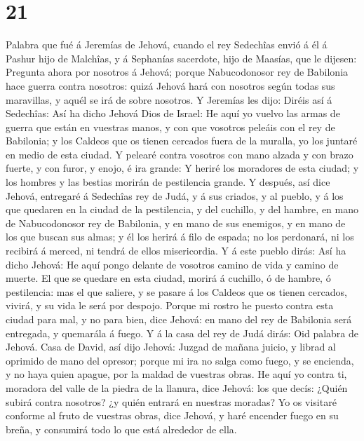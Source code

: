 \hypertarget{section-20}{%
\section{21}\label{section-20}}

 Palabra que fué á Jeremías de Jehová, cuando el rey
Sedechîas envió á él á Pashur hijo de Malchîas, y á Sephanías sacerdote,
hijo de Maasías, que le dijesen:  Pregunta ahora por
nosotros á Jehová; porque Nabucodonosor rey de Babilonia hace guerra
contra nosotros: quizá Jehová hará con nosotros según todas sus
maravillas, y aquél se irá de sobre nosotros.  Y Jeremías
les dijo: Diréis así á Sedechîas:  Así ha dicho Jehová Dios
de Israel: He aquí yo vuelvo las armas de guerra que están en vuestras
manos, y con que vosotros peleáis con el rey de Babilonia; y los Caldeos
que os tienen cercados fuera de la muralla, yo los juntaré en medio de
esta ciudad.  Y pelearé contra vosotros con mano alzada y
con brazo fuerte, y con furor, y enojo, é ira grande:  Y
heriré los moradores de esta ciudad; y los hombres y las bestias morirán
de pestilencia grande.  Y después, así dice Jehová,
entregaré á Sedechîas rey de Judá, y á sus criados, y al pueblo, y á los
que quedaren en la ciudad de la pestilencia, y del cuchillo, y del
hambre, en mano de Nabucodonosor rey de Babilonia, y en mano de sus
enemigos, y en mano de los que buscan sus almas; y él los herirá á filo
de espada; no los perdonará, ni los recibirá á merced, ni tendrá de
ellos misericordia.  Y á este pueblo dirás: Así ha dicho
Jehová: He aquí pongo delante de vosotros camino de vida y camino de
muerte.  El que se quedare en esta ciudad, morirá á
cuchillo, ó de hambre, ó pestilencia: mas el que saliere, y se pasare á
los Caldeos que os tienen cercados, vivirá, y su vida le será por
despojo.  Porque mi rostro he puesto contra esta ciudad
para mal, y no para bien, dice Jehová: en mano del rey de Babilonia será
entregada, y quemarála á fuego.  Y á la casa del rey de
Judá dirás: Oid palabra de Jehová.  Casa de David, así dijo
Jehová: Juzgad de mañana juicio, y librad al oprimido de mano del
opresor; porque mi ira no salga como fuego, y se encienda, y no haya
quien apague, por la maldad de vuestras obras.  He aquí yo
contra ti, moradora del valle de la piedra de la llanura, dice Jehová:
los que decís: ¿Quién subirá contra nosotros? ¿y quién entrará en
nuestras moradas?  Yo os visitaré conforme al fruto de
vuestras obras, dice Jehová, y haré encender fuego en su breña, y
consumirá todo lo que está alrededor de ella.

